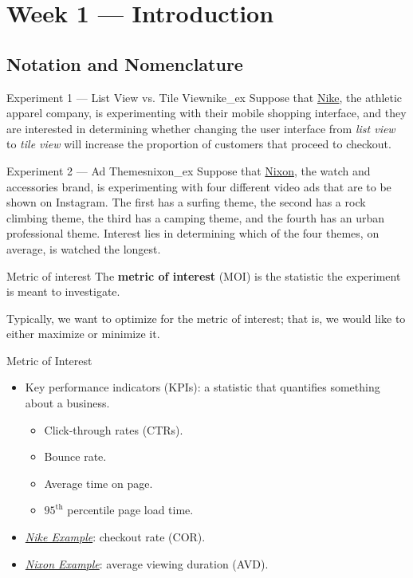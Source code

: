 \chapter{Week 1 --- Introduction}
\section{Notation and Nomenclature}
\begin{Example}{Experiment 1 --- List View vs. Tile View}{nike_ex}
    Suppose that \href{https://www.nike.com/ca/}{Nike}, the athletic apparel company,
    is experimenting with their mobile shopping interface, and they are interested in determining
    whether changing the user interface from \emph{list view}
    to \emph{tile view} will increase the proportion
    of customers that proceed to checkout.
\end{Example}
\begin{Example}{Experiment 2 --- Ad Themes}{nixon_ex}
    Suppose that \href{https://www.nixon.com/ca/en}{Nixon},
    the watch and accessories brand, is experimenting
    with four different video ads that are to be shown on Instagram.
    The first has a surfing theme, the second has a rock climbing theme, the third
    has a camping theme, and the fourth has an urban professional theme.
    Interest lies in determining which of the four themes, on average,
    is watched the longest.
\end{Example}
\begin{Definition}{Metric of interest}{}
    The \textbf{metric of interest} (MOI) is the statistic the experiment is
    meant to investigate.
\end{Definition}
\begin{Remark}{}{}
    Typically, we want to optimize for the metric of interest; that is,
    we would like to either maximize or minimize it.
\end{Remark}
\begin{Example}{Metric of Interest}{}
    \begin{itemize}
        \item Key performance indicators (KPIs): a statistic that
              quantifies something about a business.
              \begin{itemize}
                  \item Click-through rates (CTRs).
                  \item Bounce rate.
                  \item Average time on page.
                  \item $ 95^{\text{th}} $ percentile page load time.
              \end{itemize}
        \item \emph{\hyperref[ex:nike_ex]{Nike Example}}: checkout rate (COR).
        \item \emph{\hyperref[ex:nixon_ex]{Nixon Example}}: average viewing duration (AVD).
    \end{itemize}
\end{Example}
